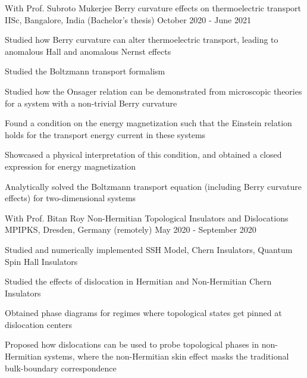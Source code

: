 \begin{cventries}
\cventry
{With Prof. Subroto Mukerjee} %
{Berry curvature effects on thermoelectric transport} %
{IISc, Bangalore, India \space \space\space\space\space\space\space\space\space\space\space(Bachelor's thesis)} %
{October 2020 - June 2021} %
{
	\begin{cvitems} %
		\item {Studied how Berry curvature can alter thermoelectric transport, leading to anomalous Hall and anomalous Nernst effects}
		\item {Studied the Boltzmann transport formalism}
		\item {Studied how the Onsager relation can be demonstrated from microscopic theories for a system with a non-trivial Berry curvature}
		\item {Found a condition on the energy magnetization such that the Einstein relation holds for the transport energy current in these systems}
		\item {Showcased a physical interpretation of this condition, and obtained a closed expression for energy magnetization}
		\item {Analytically solved the Boltzmann transport equation (including Berry curvature effects) for two-dimensional systems}
	\end{cvitems}
}
	
\cventry
{With Prof. Bitan Roy} %
{Non-Hermitian Topological Insulators and Dislocations} %
{MPIPKS, Dresden, Germany (remotely)} %
{May 2020 - September 2020} %
{
	\begin{cvitems} %
		\item {Studied and numerically implemented SSH Model, Chern Insulators, Quantum Spin Hall Insulators}
		\item {Studied the effects of dislocation in Hermitian and Non-Hermitian Chern Insulators}
		\item {Obtained phase diagrams for regimes where topological states get pinned at dislocation centers}
		\item {Proposed how dislocations can be used to probe topological phases in non-Hermitian systems, where the non-Hermitian skin effect masks the traditional bulk-boundary correspondence}
	\end{cvitems}
}


\end{cventries}

